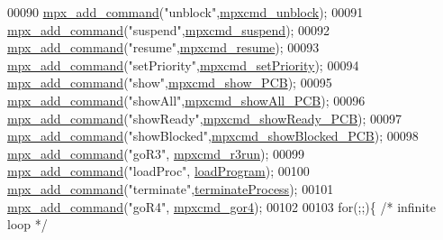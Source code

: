 \begin{DoxyCode}
00090         \hyperlink{_m_p_x___c_m_d_8_c_a52c02eb85fda9ac4278e10088a192e89}{mpx_add_command}(\textcolor{stringliteral}{"unblock"},\hyperlink{mpx__r2_8c_a1363a7b6156a84057936c3fd91d91f69}{mpxcmd_unblock});
00091         \hyperlink{_m_p_x___c_m_d_8_c_a52c02eb85fda9ac4278e10088a192e89}{mpx_add_command}(\textcolor{stringliteral}{"suspend"},\hyperlink{mpx__r2_8c_a697f0f432dba18606d9e514eda9cd073}{mpxcmd_suspend});
00092         \hyperlink{_m_p_x___c_m_d_8_c_a52c02eb85fda9ac4278e10088a192e89}{mpx_add_command}(\textcolor{stringliteral}{"resume"},\hyperlink{mpx__r2_8c_a3c47daf087934d234d896e35e4c03f3b}{mpxcmd_resume});
00093         \hyperlink{_m_p_x___c_m_d_8_c_a52c02eb85fda9ac4278e10088a192e89}{mpx_add_command}(\textcolor{stringliteral}{"setPriority"},\hyperlink{mpx__r2_8c_a4505a685b9ab69940541dc4e973e0f01}{mpxcmd_setPriority});
00094         \hyperlink{_m_p_x___c_m_d_8_c_a52c02eb85fda9ac4278e10088a192e89}{mpx_add_command}(\textcolor{stringliteral}{"show"},\hyperlink{mpx__r2_8c_ae52d77243725636a3b23d05235fee141}{mpxcmd_show_PCB});
00095         \hyperlink{_m_p_x___c_m_d_8_c_a52c02eb85fda9ac4278e10088a192e89}{mpx_add_command}(\textcolor{stringliteral}{"showAll"},\hyperlink{mpx__r2_8c_a69559f93fe1b569abf6e846a426191a9}{mpxcmd_showAll_PCB});
00096         \hyperlink{_m_p_x___c_m_d_8_c_a52c02eb85fda9ac4278e10088a192e89}{mpx_add_command}(\textcolor{stringliteral}{"showReady"},\hyperlink{mpx__r2_8c_aeaac6d37294f767e31c3789971c5ecd4}{mpxcmd_showReady_PCB});
00097         \hyperlink{_m_p_x___c_m_d_8_c_a52c02eb85fda9ac4278e10088a192e89}{mpx_add_command}(\textcolor{stringliteral}{"showBlocked"},\hyperlink{mpx__r2_8c_ae1ef92a5e3a8869ec269a23b3b854c9b}{mpxcmd_showBlocked_PCB});
00098         \hyperlink{_m_p_x___c_m_d_8_c_a52c02eb85fda9ac4278e10088a192e89}{mpx_add_command}(\textcolor{stringliteral}{"goR3"}, \hyperlink{mpx__r3_8c_a204c76cc251c17612164688f0b1272ad}{mpxcmd_r3run});
00099         \hyperlink{_m_p_x___c_m_d_8_c_a52c02eb85fda9ac4278e10088a192e89}{mpx_add_command}(\textcolor{stringliteral}{"loadProc"}, \hyperlink{mpx__r4_8c_a794e5f6c45d4d9b18fff6a530ce90f86}{loadProgram});
00100         \hyperlink{_m_p_x___c_m_d_8_c_a52c02eb85fda9ac4278e10088a192e89}{mpx_add_command}(\textcolor{stringliteral}{"terminate"},\hyperlink{mpx__r4_8c_aaa714b85ce262f949d018430daf6da00}{terminateProcess});
00101         \hyperlink{_m_p_x___c_m_d_8_c_a52c02eb85fda9ac4278e10088a192e89}{mpx_add_command}(\textcolor{stringliteral}{"goR4"}, \hyperlink{mpx__r3_8c_afff189bf2a21f1da2a30be81b57da08d}{mpxcmd_gor4});
00102 
00103         \textcolor{keywordflow}{for}(;;)\{ \textcolor{comment}{/* infinite loop */}

\end{DoxyCode}
